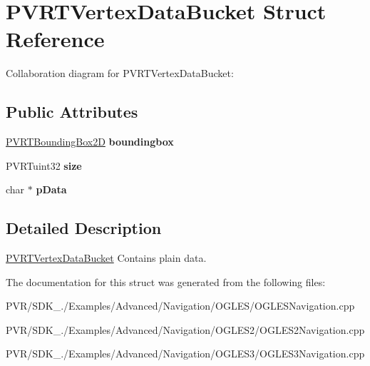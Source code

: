 \hypertarget{struct_p_v_r_t_vertex_data_bucket}{\section{P\+V\+R\+T\+Vertex\+Data\+Bucket Struct Reference}
\label{struct_p_v_r_t_vertex_data_bucket}
}


Collaboration diagram for P\+V\+R\+T\+Vertex\+Data\+Bucket\+:
\subsection*{Public Attributes}
\begin{DoxyCompactItemize}
\item 
\hypertarget{struct_p_v_r_t_vertex_data_bucket_ab2d7fe2db92bb080203e745f427ccc1b}{\hyperlink{struct_p_v_r_t_bounding_box2_d}{P\+V\+R\+T\+Bounding\+Box2\+D} {\bfseries boundingbox}}\label{struct_p_v_r_t_vertex_data_bucket_ab2d7fe2db92bb080203e745f427ccc1b}

\item 
\hypertarget{struct_p_v_r_t_vertex_data_bucket_a0c436df70b16c4bd17a1a58793ab83ed}{P\+V\+R\+Tuint32 {\bfseries size}}\label{struct_p_v_r_t_vertex_data_bucket_a0c436df70b16c4bd17a1a58793ab83ed}

\item 
\hypertarget{struct_p_v_r_t_vertex_data_bucket_a1bd26c6c72feda8a5ba2e0b6a8e22f5d}{char $\ast$ {\bfseries p\+Data}}\label{struct_p_v_r_t_vertex_data_bucket_a1bd26c6c72feda8a5ba2e0b6a8e22f5d}

\end{DoxyCompactItemize}


\subsection{Detailed Description}


  \hyperlink{struct_p_v_r_t_vertex_data_bucket}{P\+V\+R\+T\+Vertex\+Data\+Bucket}  Contains plain data. 

The documentation for this struct was generated from the following files\+:\begin{DoxyCompactItemize}
\item 
P\+V\+R/\+S\+D\+K\+\_./\+Examples/\+Advanced/\+Navigation/\+O\+G\+L\+E\+S/O\+G\+L\+E\+S\+Navigation.\+cpp\item 
P\+V\+R/\+S\+D\+K\+\_./\+Examples/\+Advanced/\+Navigation/\+O\+G\+L\+E\+S2/O\+G\+L\+E\+S2\+Navigation.\+cpp\item 
P\+V\+R/\+S\+D\+K\+\_./\+Examples/\+Advanced/\+Navigation/\+O\+G\+L\+E\+S3/O\+G\+L\+E\+S3\+Navigation.\+cpp\end{DoxyCompactItemize}
